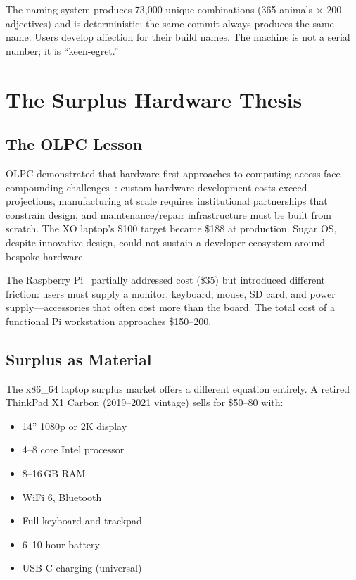 \documentclass[10pt,letterpaper,twocolumn]{article}
\begin{document}
The naming system produces 73,000 unique combinations (365 animals $\times$ 200 adjectives) and is deterministic: the same commit always produces the same name. Users develop affection for their build names. The machine is not a serial number; it is ``keen-egret.''


\section{The Surplus Hardware Thesis}
\label{sec:surplus}

\subsection{The OLPC Lesson}

OLPC demonstrated that hardware-first approaches to computing access face compounding challenges~\citep{kraemer2009olpc}: custom hardware development costs exceed projections, manufacturing at scale requires institutional partnerships that constrain design, and maintenance/repair infrastructure must be built from scratch. The XO laptop's \$100 target became \$188 at production. Sugar OS, despite innovative design, could not sustain a developer ecosystem around bespoke hardware.

The Raspberry Pi~\citep{raspberry2012} partially addressed cost (\$35) but introduced different friction: users must supply a monitor, keyboard, mouse, SD card, and power supply---accessories that often cost more than the board. The total cost of a functional Pi workstation approaches \$150--200.

\subsection{Surplus as Material}

The x86\_64 laptop surplus market offers a different equation entirely. A retired ThinkPad X1 Carbon (2019--2021 vintage) sells for \$50--80 with:

\begin{itemize}
  \item 14'' 1080p or 2K display
  \item 4--8 core Intel processor
  \item 8--16\,GB RAM
  \item WiFi 6, Bluetooth
  \item Full keyboard and trackpad
  \item 6--10 hour battery
  \item USB-C charging (universal)
\end{itemize}
\end{document}
